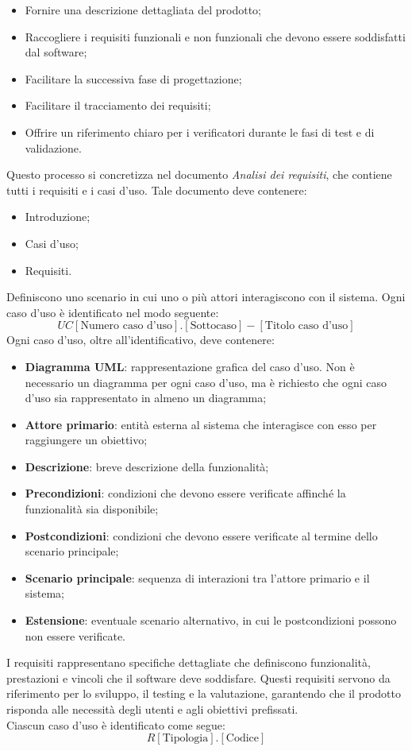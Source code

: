 \begin{itemize}
    \item Fornire una descrizione dettagliata del prodotto;
    \item Raccogliere i requisiti funzionali e non funzionali che devono essere
          soddisfatti dal software;
    \item Facilitare la successiva fase di progettazione;
    \item Facilitare il tracciamento dei requisiti;
    \item Offrire un riferimento chiaro per i verificatori durante le fasi di test e di
          validazione.
\end{itemize}

Questo processo si concretizza nel documento \textit{Analisi dei requisiti},
che contiene tutti i requisiti e i casi d'uso. Tale documento deve contenere:
\begin{itemize}
    \item Introduzione;
    \item Casi d'uso;
    \item Requisiti.
\end{itemize}
Definiscono uno scenario in cui uno o più attori interagiscono con il sistema. Ogni caso d'uso è
identificato nel modo seguente:
\textbf{
\[
    UC[\text{Numero caso d'uso}].[\text{Sottocaso}] - [\text{Titolo caso d'uso}]
\]
}
Ogni caso d'uso, oltre all'identificativo, deve contenere:
\begin{itemize}
    \item \textbf{Diagramma UML}: rappresentazione grafica del caso d'uso. Non è necessario un diagramma per ogni caso d'uso,
          ma è richiesto che ogni caso d'uso sia rappresentato in almeno un diagramma;
    \item \textbf{Attore primario}: entità esterna al sistema che interagisce con esso per raggiungere un obiettivo;
    \item \textbf{Descrizione}: breve descrizione della funzionalità;
    \item \textbf{Precondizioni}: condizioni che devono essere verificate affinché la funzionalità sia disponibile;
    \item \textbf{Postcondizioni}: condizioni che devono essere verificate al termine dello scenario principale;
    \item \textbf{Scenario principale}: sequenza di interazioni tra l'attore primario e il sistema;
    \item \textbf{Estensione}: eventuale scenario alternativo, in cui le postcondizioni possono non essere verificate.
\end{itemize}
I requisiti rappresentano specifiche dettagliate che definiscono funzionalità, prestazioni e vincoli che il
software deve soddisfare. Questi requisiti servono da riferimento per lo sviluppo, il testing e la valutazione,
garantendo che il prodotto risponda alle necessità degli utenti e agli obiettivi prefissati.\\
Ciascun caso d'uso è identificato come segue:
\textbf{
\[
    R[\text{Tipologia}].[ \text{Codice}]
\]
}

